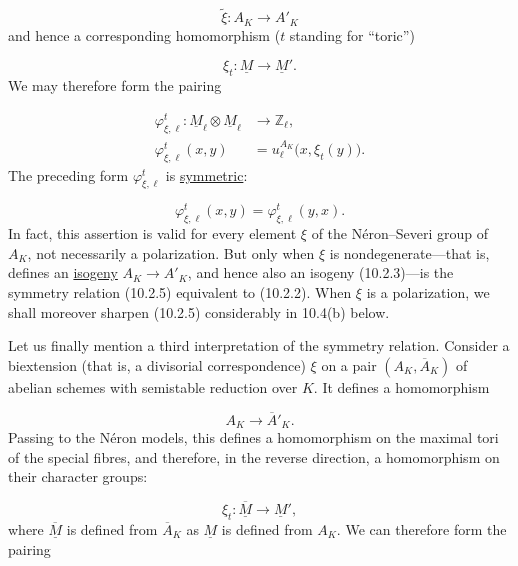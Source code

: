 \begin{equation*}
\widetilde\xi:A_K\longrightarrow A'_K
\end{equation*}
and hence a corresponding homomorphism ($t$ standing for ``toric'')

\begin{equation}\tag{10.2.3}
\xi_t:\underline M\longrightarrow\underline M'.
\end{equation}
We may therefore form the pairing

\begin{equation}\tag{10.2.4}
\begin{aligned}
\varphi^t_{\xi,\ell}:\underline M_\ell\otimes\underline M_\ell
 &\longrightarrow\mathbb Z_\ell,\\
\varphi^t_{\xi,\ell}(x,y)&=u_\ell^{A_K}\bigl(x,\xi_t(y)\bigr).
\end{aligned}
\end{equation}
The preceding form $\varphi^t_{\xi,\ell}$ is \underline{symmetric}:

\begin{equation}\tag{10.2.5}
\varphi^t_{\xi,\ell}(x,y)=\varphi^t_{\xi,\ell}(y,x).
\end{equation}
In fact, this assertion is valid for every element $\xi$ of the
Néron--Severi group of $A_K$, not necessarily a polarization. But only
when $\xi$ is nondegenerate---that is, defines an \underline{isogeny}
$A_K\longrightarrow A'_K$, and hence also an isogeny (10.2.3)---is the
symmetry relation (10.2.5) equivalent to (10.2.2). When $\xi$ is a
polarization, we shall moreover sharpen (10.2.5) considerably in 10.4(b)
below.

Let us finally mention a third interpretation of the symmetry relation.
Consider a biextension (that is, a divisorial correspondence) $\xi$ on a
pair $(A_K,\overline A_K)$ of abelian schemes with semistable reduction
over $K$. It defines a homomorphism

\begin{equation*}
A_K\longrightarrow\overline A'_K.
\end{equation*}
Passing to the Néron models, this defines a homomorphism on the maximal
tori of the special fibres, and therefore, in the reverse direction, a
homomorphism on their character groups:

\begin{equation}\tag{10.2.6}
\xi_t:\overline{\underline M}\longrightarrow\underline M',
\end{equation}
where $\overline{\underline M}$ is defined from $\overline A_K$ as
$\underline M$ is defined from $A_K$. We can therefore form the pairing


